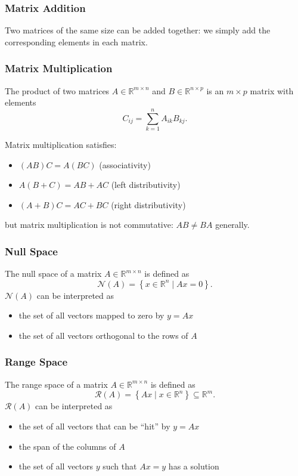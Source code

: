 \documentclass[11pt]{article}
\begin{document}
\subsubsection*{Matrix Addition}
Two matrices of the same size can be added together: we simply add the corresponding elements in each matrix. 

\subsubsection*{Matrix Multiplication}
The product of two matrices $A \in \mathbb{R}^{m\times n}$ and $B \in \mathbb{R}^{n \times p}$ is an $m \times p$ matrix with elements 
\[ C_{ij} = \sum\limits_{k=1}^n A_{ik}B_{kj}. \] 

Matrix multiplication satisfies:
\begin{itemize}
    \item $(AB)C = A(BC)$ (associativity)
    \item $A(B+C) = AB + AC$ (left distributivity)
    \item $(A+B)C = AC + BC$ (right distributivity)
\end{itemize}
but matrix multiplication is not commutative: $AB \neq BA$ generally. \par 

\subsubsection*{Null Space}
The null space of a matrix $A \in \mathbb{R}^{m\times n}$ is defined as 
\[ \mathcal{N}(A) = \left\{ x \in \mathbb{R}^n \mid Ax = 0 \right\}. \] 
$\mathcal{N}(A)$ can be interpreted as
\begin{itemize}
    \item the set of all vectors mapped to zero by $y = Ax$
    \item the set of all vectors orthogonal to the rows of $A$
\end{itemize}
\subsubsection*{Range Space} 
The range space of a matrix $A \in \mathbb{R}^{m\times n}$ is defined as 
\[ \mathcal{R}(A) = \left\{ Ax \mid x \in \mathbb{R}^n \right\} \subseteq \mathbb{R}^m. \] 
$\mathcal{R}(A)$ can be interpreted as 
\begin{itemize}
    \item the set of all vectors that can be ``hit'' by $y = Ax$
    \item the span of the columns of $A$
    \item the set of all vectors $y$ such that $Ax = y$ has a solution
\end{itemize}
\end{document}
